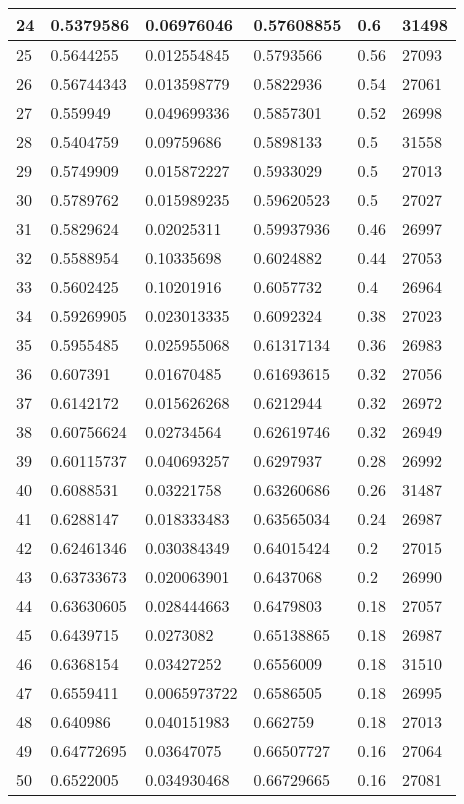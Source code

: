 \begin{longtable}{|l|l|l|l|l|l|}
24 & 0.5379586 & 0.06976046 & 0.57608855 & 0.6 & 31498 \\ \hline 
25 & 0.5644255 & 0.012554845 & 0.5793566 & 0.56 & 27093 \\ \hline 
26 & 0.56744343 & 0.013598779 & 0.5822936 & 0.54 & 27061 \\ \hline 
27 & 0.559949 & 0.049699336 & 0.5857301 & 0.52 & 26998 \\ \hline 
28 & 0.5404759 & 0.09759686 & 0.5898133 & 0.5 & 31558 \\ \hline 
29 & 0.5749909 & 0.015872227 & 0.5933029 & 0.5 & 27013 \\ \hline 
30 & 0.5789762 & 0.015989235 & 0.59620523 & 0.5 & 27027 \\ \hline 
31 & 0.5829624 & 0.02025311 & 0.59937936 & 0.46 & 26997 \\ \hline 
32 & 0.5588954 & 0.10335698 & 0.6024882 & 0.44 & 27053 \\ \hline 
33 & 0.5602425 & 0.10201916 & 0.6057732 & 0.4 & 26964 \\ \hline 
34 & 0.59269905 & 0.023013335 & 0.6092324 & 0.38 & 27023 \\ \hline 
35 & 0.5955485 & 0.025955068 & 0.61317134 & 0.36 & 26983 \\ \hline 
36 & 0.607391 & 0.01670485 & 0.61693615 & 0.32 & 27056 \\ \hline 
37 & 0.6142172 & 0.015626268 & 0.6212944 & 0.32 & 26972 \\ \hline 
38 & 0.60756624 & 0.02734564 & 0.62619746 & 0.32 & 26949 \\ \hline 
39 & 0.60115737 & 0.040693257 & 0.6297937 & 0.28 & 26992 \\ \hline 
40 & 0.6088531 & 0.03221758 & 0.63260686 & 0.26 & 31487 \\ \hline 
41 & 0.6288147 & 0.018333483 & 0.63565034 & 0.24 & 26987 \\ \hline 
42 & 0.62461346 & 0.030384349 & 0.64015424 & 0.2 & 27015 \\ \hline 
43 & 0.63733673 & 0.020063901 & 0.6437068 & 0.2 & 26990 \\ \hline 
44 & 0.63630605 & 0.028444663 & 0.6479803 & 0.18 & 27057 \\ \hline 
45 & 0.6439715 & 0.0273082 & 0.65138865 & 0.18 & 26987 \\ \hline 
46 & 0.6368154 & 0.03427252 & 0.6556009 & 0.18 & 31510 \\ \hline 
47 & 0.6559411 & 0.0065973722 & 0.6586505 & 0.18 & 26995 \\ \hline 
48 & 0.640986 & 0.040151983 & 0.662759 & 0.18 & 27013 \\ \hline 
49 & 0.64772695 & 0.03647075 & 0.66507727 & 0.16 & 27064 \\ \hline 
50 & 0.6522005 & 0.034930468 & 0.66729665 & 0.16 & 27081 \\ \hline 
\end{longtable}